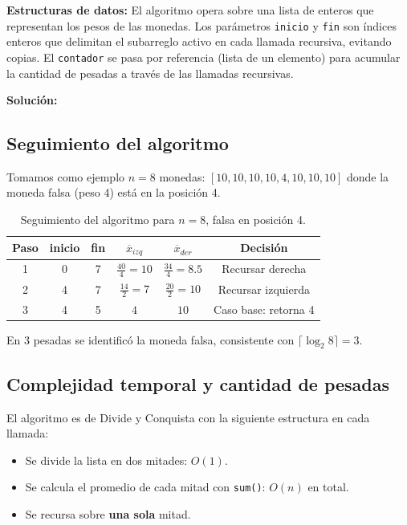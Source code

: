 \textbf{Estructuras de datos:} El algoritmo opera sobre una lista de
enteros que representan los pesos de las monedas. Los parámetros
\texttt{inicio} y \texttt{fin} son índices enteros que delimitan el
subarreglo activo en cada llamada recursiva, evitando copias. El
\texttt{contador} se pasa por referencia (lista de un elemento) para
acumular la cantidad de pesadas a través de las llamadas recursivas.

\textbf{Solución:}



\subsection{Seguimiento del algoritmo}

Tomamos como ejemplo $n = 8$ monedas: $[10, 10, 10, 10, 4, 10, 10, 10]$
donde la moneda falsa (peso 4) está en la posición 4.

\begin{table}[h]
\centering
\begin{tabular}{c c c c c c}
\hline
Paso & inicio & fin & $\overline{x}_{izq}$ & $\overline{x}_{der}$ & Decisión \\
\hline
1 & 0 & 7 & $\frac{40}{4}=10$ & $\frac{34}{4}=8.5$ & Recursar derecha \\
2 & 4 & 7 & $\frac{14}{2}=7$   & $\frac{20}{2}=10$  & Recursar izquierda \\
3 & 4 & 5 & $4$               & $10$               & Caso base: retorna 4 \\
\hline
\end{tabular}
\caption{Seguimiento del algoritmo para $n=8$, falsa en posición 4.}
\label{tab:ej1-seguimiento}
\end{table}

En 3 pesadas se identificó la moneda falsa, consistente con
$\lceil \log_2 8 \rceil = 3$.

\subsection{Complejidad temporal y cantidad de pesadas}

El algoritmo es de Divide y Conquista con la siguiente estructura en cada llamada:
\begin{itemize}
	\item Se divide la lista en dos mitades: $O(1)$.
	\item Se calcula el promedio de cada mitad con \texttt{sum()}: $O(n)$ en total.
	\item Se recursa sobre \textbf{una sola} mitad.
\end{itemize}

